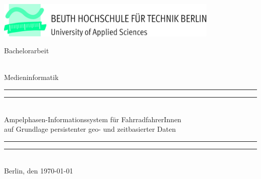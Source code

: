 \begin{titlepage}


\center %
 

\begin{center}
\includegraphics[width=0.8\textwidth]{img/beuth}  \\[2cm]
\end{center}

\begin{Huge}
Bachelorarbeit
\end{Huge}\\[0.5cm]
\LARGE{Medieninformatik}\\[0.5cm]

\rule{\textwidth}{1.6pt}\vspace*{-\baselineskip}\vspace*{2pt} %
\rule{\textwidth}{0.4pt}\\[\baselineskip] %
{\LARGE Ampelphasen-Informationssystem für FahrradfahrerInnen\\ auf Grundlage persistenter geo- und zeitbasierter Daten}
\rule{\textwidth}{0.4pt}\vspace*{-\baselineskip}\vspace{3.2pt} %
\rule{\textwidth}{1.6pt}\\[\baselineskip] %

{\Large Berlin, den \today{}} \\[7cm]


\end{titlepage}
